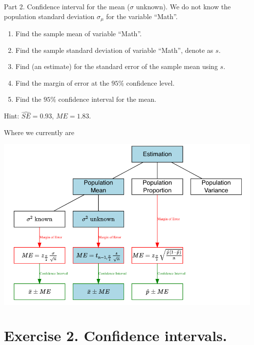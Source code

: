 \documentclass[
  10pt,
  ignorenonframetext,
]{beamer}
\begin{document}
\begin{frame}{Part 2. Confidence interval for the mean (\(\sigma\)
unknown).}
\protect\hypertarget{part-2.-confidence-interval-for-the-mean-sigma-unknown.}{}
We do not know the population standard deviation \(\sigma_\mu\) for the
variable ``Math''.

\begin{enumerate}
\item
  Find the sample mean of variable ``Math''.
\item
  Find the sample standard deviation of variable ``Math'', denote as
  \(s\).
\item
  Find (an estimate) for the standard error of the sample mean using
  \(s\).
\item
  Find the margin of error at the \(95\%\) confidence level.
\item
  Find the \(95\%\) confidence interval for the mean.
\end{enumerate}

Hint: \(\widehat{SE}=0.93\), \(ME=1.83\).
\end{frame}

\begin{frame}{Where we currently are}
\protect\hypertarget{where-we-currently-are-1}{}
\begin{center}\includegraphics[width=0.9\linewidth]{pictures/EstimationGuide-Case2} \end{center}
\end{frame}

\hypertarget{exercise-2.-confidence-intervals.}{%
\section{Exercise 2. Confidence
intervals.}\label{exercise-2.-confidence-intervals.}}
\end{document}
